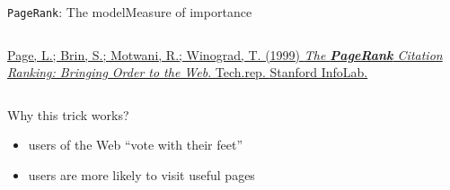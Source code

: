\documentclass[xcolor=table,final]{beamer} %
\newcommand{\PageRank}{\texttt{PageRank}\xspace}
\begin{document}
\begin{frame}{\PageRank : The model}{Measure of importance}
\begin{columns}
\begin{column}{0.7\textwidth}
\begin{exampleblock}{}
        \href{http://ilpubs.stanford.edu:8090/422/}{{\tiny
            \underline{Page, L.}; \underline{Brin, S.}; Motwani, R.; Winograd, T. (\underline{1999}) 
            \textit{The \textbf{PageRank} Citation Ranking: Bringing Order to the Web}. Tech.rep. \underline{Stanford} InfoLab.}}
      \end{exampleblock}
    \end{column}
  \end{columns}
  \pause
  \begin{centering}
  \end{centering}
  \begin{block}{Why this trick works?}
    \begin{itemize}
    \item users of the Web ``vote with their feet'' %
    \item users are more likely to visit useful pages
    \end{itemize}
  \end{block}
\end{frame}
\end{document}
